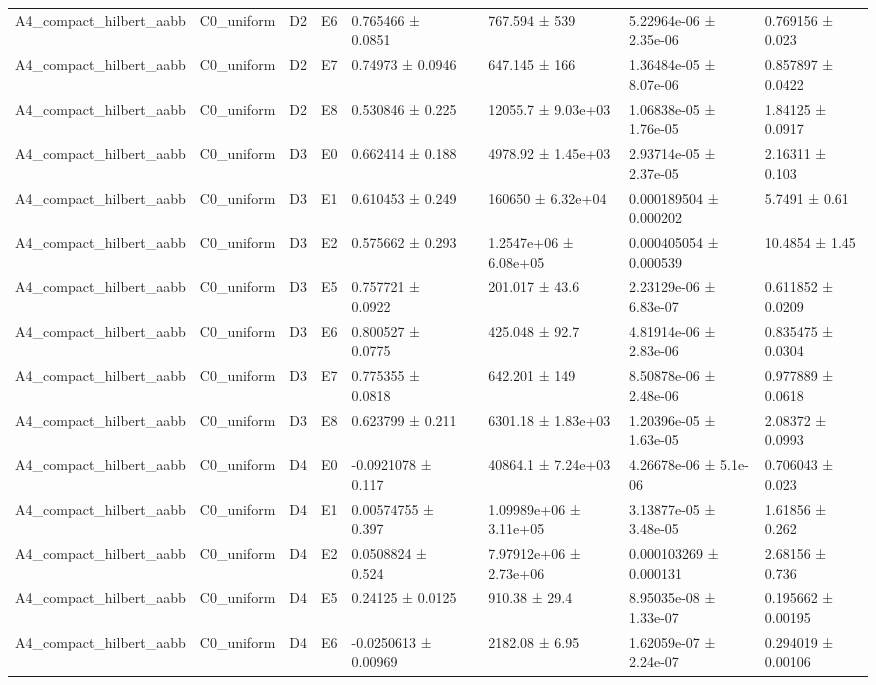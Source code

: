 \begin{table}
\begin{tabular}{lllllllll}
A4\_compact\_hilbert\_aabb & C0\_uniform & D2 & E6 & 0.765466 ± 0.0851 &  & 767.594 ± 539 & 5.22964e-06 ± 2.35e-06 & 0.769156 ± 0.023 \\
A4\_compact\_hilbert\_aabb & C0\_uniform & D2 & E7 & 0.74973 ± 0.0946 &  & 647.145 ± 166 & 1.36484e-05 ± 8.07e-06 & 0.857897 ± 0.0422 \\
A4\_compact\_hilbert\_aabb & C0\_uniform & D2 & E8 & 0.530846 ± 0.225 &  & 12055.7 ± 9.03e+03 & 1.06838e-05 ± 1.76e-05 & 1.84125 ± 0.0917 \\
A4\_compact\_hilbert\_aabb & C0\_uniform & D3 & E0 & 0.662414 ± 0.188 &  & 4978.92 ± 1.45e+03 & 2.93714e-05 ± 2.37e-05 & 2.16311 ± 0.103 \\
A4\_compact\_hilbert\_aabb & C0\_uniform & D3 & E1 & 0.610453 ± 0.249 &  & 160650 ± 6.32e+04 & 0.000189504 ± 0.000202 & 5.7491 ± 0.61 \\
A4\_compact\_hilbert\_aabb & C0\_uniform & D3 & E2 & 0.575662 ± 0.293 &  & 1.2547e+06 ± 6.08e+05 & 0.000405054 ± 0.000539 & 10.4854 ± 1.45 \\
A4\_compact\_hilbert\_aabb & C0\_uniform & D3 & E5 & 0.757721 ± 0.0922 &  & 201.017 ± 43.6 & 2.23129e-06 ± 6.83e-07 & 0.611852 ± 0.0209 \\
A4\_compact\_hilbert\_aabb & C0\_uniform & D3 & E6 & 0.800527 ± 0.0775 &  & 425.048 ± 92.7 & 4.81914e-06 ± 2.83e-06 & 0.835475 ± 0.0304 \\
A4\_compact\_hilbert\_aabb & C0\_uniform & D3 & E7 & 0.775355 ± 0.0818 &  & 642.201 ± 149 & 8.50878e-06 ± 2.48e-06 & 0.977889 ± 0.0618 \\
A4\_compact\_hilbert\_aabb & C0\_uniform & D3 & E8 & 0.623799 ± 0.211 &  & 6301.18 ± 1.83e+03 & 1.20396e-05 ± 1.63e-05 & 2.08372 ± 0.0993 \\
A4\_compact\_hilbert\_aabb & C0\_uniform & D4 & E0 & -0.0921078 ± 0.117 &  & 40864.1 ± 7.24e+03 & 4.26678e-06 ± 5.1e-06 & 0.706043 ± 0.023 \\
A4\_compact\_hilbert\_aabb & C0\_uniform & D4 & E1 & 0.00574755 ± 0.397 &  & 1.09989e+06 ± 3.11e+05 & 3.13877e-05 ± 3.48e-05 & 1.61856 ± 0.262 \\
A4\_compact\_hilbert\_aabb & C0\_uniform & D4 & E2 & 0.0508824 ± 0.524 &  & 7.97912e+06 ± 2.73e+06 & 0.000103269 ± 0.000131 & 2.68156 ± 0.736 \\
A4\_compact\_hilbert\_aabb & C0\_uniform & D4 & E5 & 0.24125 ± 0.0125 &  & 910.38 ± 29.4 & 8.95035e-08 ± 1.33e-07 & 0.195662 ± 0.00195 \\
A4\_compact\_hilbert\_aabb & C0\_uniform & D4 & E6 & -0.0250613 ± 0.00969 &  & 2182.08 ± 6.95 & 1.62059e-07 ± 2.24e-07 & 0.294019 ± 0.00106 \\

\end{tabular}
\end{table}
